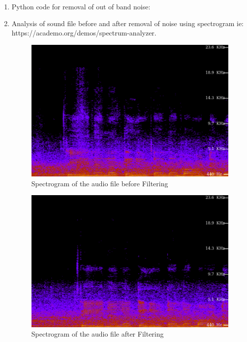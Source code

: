 \documentclass[journal,12pt,twocolumn]{IEEEtran}
\theoremstyle{remark}
\begin{document}
\begin{enumerate}[label=\thesection\arabic*.,ref=\thesection.\theenumi]
\item Python code for removal of out of band noise:
 
\item Analysis of sound file before and after removal of noise using spectrogram ie: https://academo.org/demos/spectrum-analyzer.
\begin{figure}[ht]
    \includegraphics[width=0.8\columnwidth]{figs/beforefiltering.png }
    \caption{Spectrogram of the audio file before Filtering}
    \label{fig:beforefiltering}
\end{figure}
\begin{figure}[ht]
    \includegraphics[width=0.8\columnwidth]{figs/afterfiltering.png}
    \caption{Spectrogram of the audio file after Filtering}
    \label{fig:afterfiltering}
\end{figure}
\end{enumerate}
\end{document}
